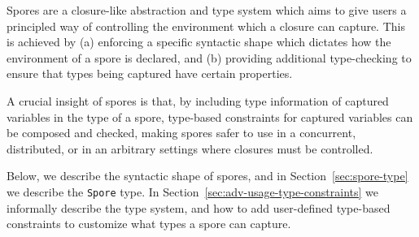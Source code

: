 \documentclass{llncs}
\begin{document}

Spores are a closure-like abstraction and type system which aims to give users
a principled way of controlling the environment which a closure can capture.
This is achieved by (a) enforcing a specific syntactic shape which dictates
how the environment of a spore is declared, and (b) providing additional type-checking
to ensure that types being captured have certain properties.

A crucial insight of spores is that, by including type information of captured
variables in the type of a spore, type-based constraints for captured
variables can be composed and checked, making spores safer to use in a
concurrent, distributed, or in an arbitrary settings where closures must be
controlled.





Below, we describe the syntactic shape of spores, and in
Section~\ref{sec:spore-type} we describe the \verb|Spore| type.
In Section~\ref{sec:adv-usage-type-constraints} we informally describe the type
system, and how to add user-defined type-based constraints to
customize what types a spore can capture.
\end{document}
